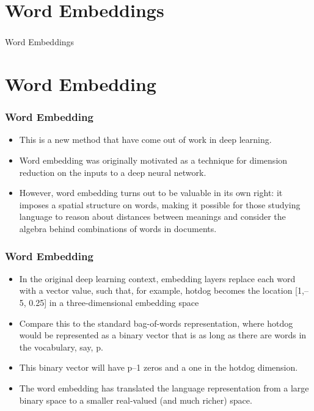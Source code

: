 \documentclass[
  shownotes,
  xcolor={svgnames},
  hyperref={colorlinks,citecolor=DarkBlue,linkcolor=DarkRed,urlcolor=DarkBlue}
  , aspectratio=169]{beamer}
\begin{document}
\section{Word Embeddings}
\begin{frame}[fragile]
\frametitle{}


\centering
{\huge \textcolor{andesred}{Word Embeddings}}


\end{frame}


\section{Word Embedding }
\begin{frame}
\frametitle{Word Embedding }

\begin{itemize}
\item This is a new method  that have come out of work in deep learning. 
\medskip
\item Word embedding was originally motivated as a technique for dimension reduction on the inputs to a deep neural network. 
\medskip
\medskip
\item However, word embedding turns out to be valuable in its own right: it imposes a spatial structure on words, making it possible for those studying language to reason about distances between meanings and consider the algebra behind combinations of words in documents. 


\end{itemize}




\end{frame}
\begin{frame}
\frametitle{Word Embedding }

\begin{itemize}
  \item In the original deep learning context, embedding layers replace each word with a vector value, such that, for example, hotdog becomes the location [1,–5, 0.25] in a three-dimensional embedding space%
  \item Compare this to the standard bag-of-words representation, where hotdog would be represented as a binary vector that is as long as there are words in the vocabulary, say, p. 
  \medskip
  \item This binary vector will have p–1 zeros and a one in the hotdog dimension. 
  \medskip
  \item The word embedding has translated the language representation from a large binary space to a smaller real-valued (and much richer) space. 
\end{itemize}


\end{frame}
\end{document}
